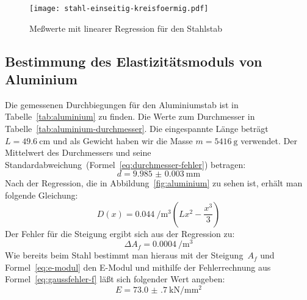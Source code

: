 \begin{figure}
  \centering
  \texttt{[image: stahl-einseitig-kreisfoermig.pdf]}
  \caption{Meßwerte mit linearer Regression für den Stahlstab}
  \label{fig:stahl}
\end{figure}

\subsection{Bestimmung des Elastizitätsmoduls von Aluminium}

Die gemessenen Durchbiegungen für den Aluminiumstab ist in
Tabelle~\ref{tab:aluminium} zu finden. Die Werte zum Durchmesser in
Tabelle~\ref{tab:aluminium-durchmesser}. Die eingespannte Länge beträgt
$L=\SI{49.6}{\centi\metre}$ und als Gewicht haben wir die Masse
$m=\SI{5416}{\gram}$ verwendet. Der Mittelwert des Durchmessers und
seine Standardabweichung~(Formel~\eqref{eq:durchmesser-fehler}) betragen:
%
\begin{equation}
  d = \SI{9.985(3)}{\milli\metre}
\end{equation}
%
Nach der Regression, die in Abbildung~\ref{fig:aluminium} zu sehen ist,
erhält man folgende Gleichung:
%
\begin{equation}
  D(x) = \SI{0.044}{\per\cubic\metre} \left(Lx^2 - \frac{x^3}{3}\right)
\end{equation}
%
Der Fehler für die Steigung ergibt sich aus der Regression zu:
%
\begin{equation}
  \Delta A_f = \SI{0.0004}{\per\cubic\metre}
\end{equation}
%
Wie bereits beim Stahl bestimmt man hieraus mit der Steigung~$A_f$ und
Formel~\eqref{eq:e-modul} den E-Modul und mithilfe der Fehlerrechnung
aus Formel~\eqref{eq:gaussfehler-f} läßt sich folgender Wert angeben:
%
\begin{equation}
  E = \SI{73.0(7)}{\kilo\newton\per\milli\metre\squared}  
\end{equation}

